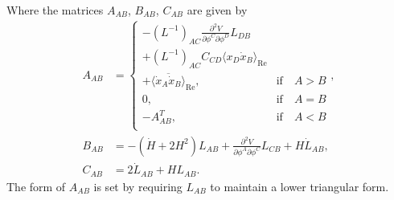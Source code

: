 Where the matrices $A_{AB}$, $B_{AB}$, $C_{AB}$ are given by
\begin{align}
  A_{AB} & =
  \begin{cases}
    -(L^{-1})_{AC}\frac{\partial^2V}{\partial\phi^C\partial\phi^D}L_{DB} \\
    + (L^{-1})_{AC}C_{CD}\langle x_D\dot{x}_B\rangle_\mathrm{Re} \\
    + \overline{\langle \dot{x}_A\dot{x}_B \rangle}_\mathrm{Re}, &  \text{if} \quad A>B \\
    0, &  \text{if} \quad A=B \\
    -A_{AB}^T, & \text{if} \quad A<B \\
  \end{cases}, \\
  B_{AB} & = -(\dot{H} + 2H^2)L_{AB} + \frac{\partial^2V}{\partial\phi^A\partial\phi^C}L_{CB} + H\dot{L}_{AB}, \\
  C_{AB} & = 2\dot{L}_{AB} + HL_{AB}.
\end{align}
The form of $A_{AB}$ is set by requiring $L_{AB}$ to maintain a lower triangular form.

